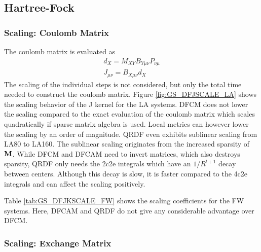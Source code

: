 %
%

\subsection{Hartree-Fock}

\subsubsection{Scaling: Coulomb Matrix}

The coulomb matrix is evaluated as
\begin{align}
d_X = M_{XY} B_{Y\mu\nu} P_{\nu\mu} \\
J_{\mu\nu} = B_{X\mu\nu} d_X
\end{align}
\noindent The scaling of the individual steps is not considered, but only the total time needed to construct the coulomb matrix. Figure \ref{fig:GS_DFJSCALE_LA} shows the scaling behavior of the J kernel for the LA systems. DFCM does not lower the scaling compared to the exact evaluation of the coulomb matrix which scales quadratically if sparse matrix algebra is used. Local metrics can however lower the scaling by an order of magnitude. QRDF even exhibits sublinear scaling from LA80 to LA160. The sublinear scaling originates from the increased sparsity of $\mathbf{M}$. While DFCM and DFCAM need to invert matrices, which also destroys sparsity, QRDF only needs the 2c2e integrals which have an $1/R^{l+1}$ decay between centers. Although this decay is slow, it is faster compared to the 4c2e integrals and can affect the scaling positively.

Table \ref{tab:GS_DFJKSCALE_FW} shows the scaling coefficients for the FW systems. Here, DFCAM and QRDF do not give any considerable advantage over DFCM. %

\subsubsection{Scaling: Exchange Matrix}

